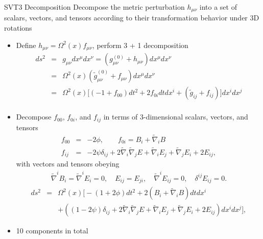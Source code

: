 \documentclass[8pt]{beamer}
\begin{document}
\begin{frame}{SVT3 Decomposition}
	Decompose the metric perturbation $h_{\mu\nu}$ into a set of scalars, vectors, and tensors according to their transformation behavior under 3D rotations
	\begin{itemize}
		\item Define $h_{\mu\nu} = \Omega^2(x)f_{\mu\nu}$, perform 3 + 1 decomposition
		\begin{eqnarray*}
			ds^2 &=& g_{\mu\nu}dx^\mu dx^\nu = (g_{\mu\nu}^{(0)} + h_{\mu\nu})dx^\mu dx^\nu
			\\
			&=& \Omega^2(x)(\tilde g_{\mu\nu}^{(0)} + f_{\mu\nu})dx^\mu dx^\nu
			\\
			&=& \Omega^2(x)\big[(-1+f_{00})dt^2 + 2f_{0i}dtdx^i + (\tilde g_{ij} + f_{ij})\big]dx^i dx^j
			\\
		\end{eqnarray*}
		\vspace{-8mm}
		\item Decompose $f_{00}$, $f_{0i}$, and $f_{ij}$ in terms of 3-dimensional scalars, vectors, and tensors
		\begin{eqnarray*}
			f_{00} &=& -2\phi,\qquad f_{0i} = B_i + \tilde\nabla_i B
			\\
			f_{ij} &=& -2\psi \delta_{ij} + 2\tilde\nabla_i \tilde\nabla_j E + \tilde\nabla_i E_j + \tilde\nabla_j E_i + 2E_{ij},
		\end{eqnarray*}
		with vectors and tensors obeying
		\begin{eqnarray*}
			\tilde\nabla^i B_i = \tilde\nabla^i E_i = 0,\quad E_{ij} = E_{ji},\quad\tilde\nabla^i E_{ij} = 0,\quad \delta^{ij}E_{ij} = 0.
		\end{eqnarray*}
		\begin{eqnarray*}
			ds^2 &=& \Omega^2(x)\big[-(1+2\phi)dt^2 + 2(B_i + \tilde\nabla_i B)dt dx^i 
			\\&&+ ((1-2\psi)\delta_{ij} + 2\tilde\nabla_i \tilde\nabla_j E + \tilde\nabla_i E_j + \tilde\nabla_j E_i + 2E_{ij})dx^i dx^j\big],
		\end{eqnarray*}

	\item 10 components in total
	\end{itemize}
\end{frame}

\end{document}
